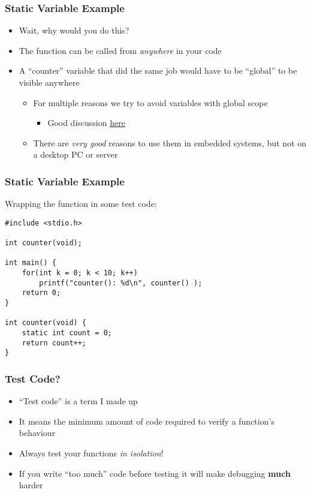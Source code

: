 \documentclass[14pt]{beamer}
\begin{document}
\begin{frame}
\frametitle{Static Variable Example}
\begin{itemize}
\item Wait, why would you do this?
\pause
\item The function can be called from \textit{anywhere} in your code
\pause
\item A ``counter'' variable that did the same job would have to be ``global'' to be visible anywhere
	\begin{itemize}
\pause
		\item For multiple reasons we try to avoid variables with global scope
			\begin{itemize}
				\item Good discussion \underline{\href{http://wiki.c2.com/?GlobalVariablesAreBad}{here}}
			\end{itemize}
\pause
		\item There are \textit{very good} reasons to use them in embedded systems, but not on a desktop PC or server
	\end{itemize}
\end{itemize}
\end{frame}

\begin{frame}[fragile]
\frametitle{Static Variable Example}
Wrapping the function in some test code:
\begin{lstlisting}[style=CStyle]
#include <stdio.h>

int counter(void);

int main() {
	for(int k = 0; k < 10; k++)
		printf("counter(): %d\n", counter() );
	return 0;
}

int counter(void) {
	static int count = 0;
	return count++;
}
\end{lstlisting}
\end{frame}

\begin{frame}
\frametitle{Test Code?}
\begin{itemize}
\item ``Test code'' is a term I made up
\item It means the minimum amount of code required to verify a function's behaviour
\item Always test your functions \textit{in isolation}!
\pause
\item If you write ``too much'' code before testing it will make debugging \textbf{much} harder
\end{itemize}
\end{frame}
\end{document}
